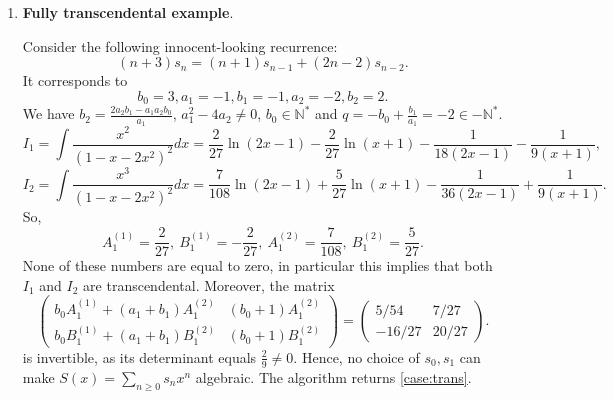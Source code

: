 \documentclass[11pt]{article}
\theoremstyle{definition}
\theoremstyle{plain}
\theoremstyle{remark}
\begin{document}
\begin{enumerate}
The recurrence
\[(n+1)s_n = (6n-3)s_{n-1}-(n-2)s_{n-2}\]
corresponds to
\[b_0=1,a_1=-6,b_1=3,a_2=1,b_2=-2.\]
We have $b_2 = \frac{2a_2b_1-a_1a_2b_0}{a_1}$, $a_1^2-4a_2\neq0$, $b_0\in\mathbb{N}^*$. Moreover, $q=-b_0+\frac{b_1}{a_1} = -\frac{3}{2} \implies q+\frac{3}{2}\in\mathbb{N}$. 
\[I_1 = \int{(1-6x+x^2)^{-\frac{3}{2}}dx}, \qquad I_2 = \int{x(1-6x+x^2)^{-\frac{3}{2}}dx}.\]
$b_0-1=0 < -2q-1 = 2 \implies$ $I_1$ is algebraic.\\
$b_0=1 = -2q-1 \implies$ $I_2$ is algebraic.

The algorithm returns \cref{case:alg}.
\item \textbf{Fully transcendental example}.

Consider the following innocent-looking recurrence:
\[(n+3)s_n = (n+1)s_{n-1} + (2n-2)s_{n-2} .\]
It corresponds to
\[b_0=3,a_1=-1,b_1=-1,a_2=-2,b_2=2.\]
We have $b_2 = \frac{2a_2b_1-a_1a_2b_0}{a_1}$, $a_1^2-4a_2\neq0$, $b_0\in\mathbb{N}^*$ and $q=-b_0+\frac{b_1}{a_1} = -2 \in-\mathbb{N}^*$. 
\[I_1 = \int{\frac{x^2}{(1-x-2x^2)^2}dx} = \frac{2}{27}\ln(2x-1) -\frac{2}{27}\ln(x+1) - \frac{1}{18(2x-1)}-\frac{1}{9(x+1)},\]
\[I_2 = \int{\frac{x^3}{(1-x-2x^2)^2}dx} = \frac{7}{108}\ln(2x-1)+\frac{5}{27}\ln(x+1) - \frac{1}{36(2x-1)}+\frac{1}{9(x+1)}.\]
So,
\[A_1^{(1)}=\frac{2}{27}, \ B_1^{(1)}=-\frac{2}{27}, \ A_1^{(2)}=\frac{7}{108}, \ B_1^{(2)}=\frac{5}{27}.\]
None of these numbers are equal to zero, in particular this implies that both $I_1$ and $I_2$ are transcendental. Moreover, the matrix
\[
\begin{pmatrix}
b_0A_1^{(1)} + (a_1+b_1)A_1^{(2)} &  (b_0+1)A_1^{(2)}\\
b_0B_1^{(1)} + (a_1+b_1)B_1^{(2)} & (b_0+1)B_1^{(2)}
\end{pmatrix} 
=
\begin{pmatrix}
5/54 &  7/27\\
-16/27 & 20/27
\end{pmatrix}. 
\]
is invertible, as its determinant equals $\frac{2}{9}\neq0$. Hence, no choice of $s_0,s_1$ can make $S(x)=\sum\limits_{n\ge0}s_nx^n$ algebraic. The algorithm returns \cref{case:trans}.
\end{enumerate}
\end{document}
